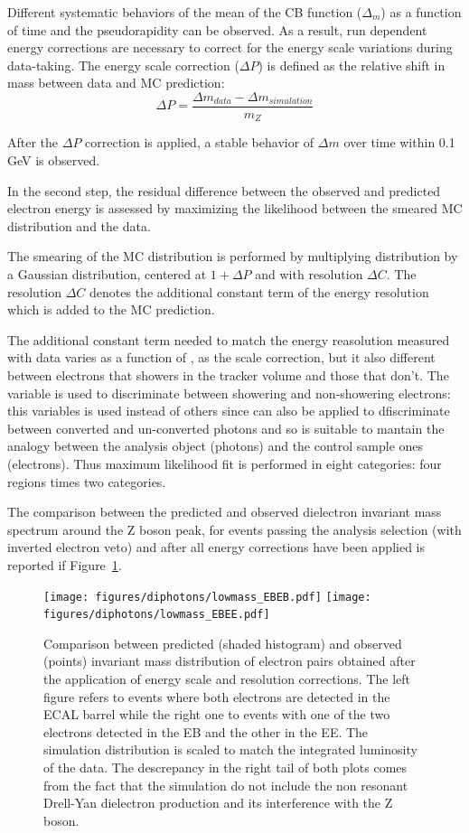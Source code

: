 Different systematic behaviors of the mean of the CB function ($\Delta_m$) as a function of time and the
pseudorapidity can be observed. As a result, run dependent energy corrections are
necessary to correct for the energy scale variations during data-taking. The energy scale
correction ($\Delta P$) is defined as the relative shift in mass between data and MC prediction:
\[
  \Delta P = \frac{\Delta m_{data} - \Delta m_{simulation}}{m_Z}
\]

After the $\Delta P$ correction is applied, a stable behavior of $\Delta m$ over time within
0.1 GeV is observed.

In the second step, the residual difference between the observed and predicted electron
energy is assessed by maximizing the likelihood between the smeared MC distribution and the data.

The smearing of the MC distribution is performed by multiplying \scE distribution by a
Gaussian distribution, centered at $1 + \Delta P$ and with resolution $\Delta C$.
The resolution $\Delta C$ denotes the additional constant term of the energy resolution which
is added to the MC prediction.

The additional constant term needed to match the energy reasolution measured with data varies as a function
of \scEta, as the scale correction, but it also different between electrons that showers in the tracker volume
and those that don't.
The \rnine variable is used to discriminate between showering and non-showering electrons: this variables is used
instead of others since can also be applied to dfiscriminate between converted and un-converted photons and
so is suitable to mantain the analogy between the analysis object (photons) and the control sample ones (electrons).
Thus maximum likelihood fit is performed in eight categories: four \scEta regions times two \rnine categories.

The comparison between the predicted and observed dielectron invariant mass spectrum around the Z boson peak,
for events passing the analysis selection (with inverted electron veto) and after all energy corrections have been applied
is reported if Figure~\ref{z_peaks}.

\begin{figure}[!h]
  \centering
  \texttt{[image: figures/diphotons/lowmass\_EBEB.pdf]}
  \texttt{[image: figures/diphotons/lowmass\_EBEE.pdf]}
  \caption{Comparison between predicted (shaded histogram) and observed (points) invariant mass distribution
    of electron pairs obtained after the application of energy scale and resolution corrections.
    The left figure refers to events where both electrons are detected in the ECAL barrel while the right one
    to events with one of the two electrons detected in the EB and the other in the EE.
    The simulation distribution is scaled to match the integrated luminosity of the data.
    The descrepancy in the right tail of both plots comes from the fact that the simulation do not include
  the non resonant Drell-Yan dielectron production and its interference with the Z boson.}
  \label{z_peaks}
\end{figure}  

